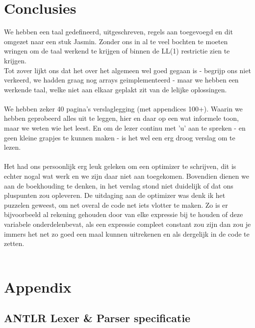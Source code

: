 \documentclass[]{article}
\begin{document}
\newpage
\section{Conclusies}
We hebben een taal gedefineerd, uitgeschreven, regels aan toegevoegd en dit omgezet naar een stuk Jasmin. Zonder ons in al te veel bochten te moeten wringen om de taal werkend te krijgen of binnen de LL(1) restrictie zien te krijgen. \\ 
Tot zover lijkt ons dat het over het algemeen wel goed gegaan is - begrijp ons niet verkeerd, we hadden graag nog arrays geimplementeerd - maar we hebben een werkende taal, welke niet aan elkaar geplakt zit van de lelijke oplossingen. \\
\\
We hebben zeker 40 pagina's verslaglegging (met appendices 100+). Waarin we hebben geprobeerd alles uit te leggen, hier en daar op een wat informele toon, maar we weten wie het leest. En om de lezer continu met 'u' aan te spreken - en geen kleine grapjes te kunnen maken - is het wel een erg droog verslag om te lezen.\\
\\
Het had ons persoonlijk erg leuk geleken om een optimizer te schrijven, dit is echter nogal wat werk en we zijn daar niet aan toegekomen. Bovendien dienen we aan de boekhouding te denken, in het verslag stond niet duidelijk of dat ons pluspunten zou opleveren.
De uitdaging aan de optimizer was denk ik het puzzelen geweest, om net overal de code net iets vlotter te maken. Zo is er bijvoorbeeld al rekening gehouden door van elke expressie bij te houden of deze variabele onderdelenbevat, als een expressie compleet constant zou zijn dan zou je immers het net zo goed een maal kunnen uitrekenen en als dergelijk in de code te zetten.\\
\\

\newpage
\section{Appendix}

\subsection{ANTLR Lexer \& Parser specificatie}


\end{document}
